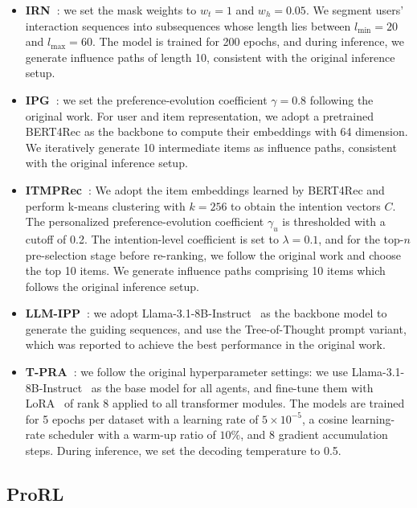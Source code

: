 \begin{itemize}
    \item \textbf{IRN~\cite{zhu2023influential}}: we set the mask weights to \(w_t = 1\) and \(w_h = 0.05\). We segment users' interaction sequences into subsequences whose length lies between \(l_{\min} = 20\) and \(l_{\max} = 60\). The model is trained for 200 epochs, and during inference, we generate influence paths of length 10, consistent with the original inference setup.
    \item \textbf{IPG~\cite{bi2024proactive}}: we set the preference-evolution coefficient $\gamma=0.8$ following the original work. For user and item representation, we adopt a pretrained BERT4Rec as the backbone to compute their embeddings with 64 dimension. We iteratively generate 10 intermediate items as influence paths, consistent with the original inference setup.
    \item \textbf{ITMPRec~\cite{lian2025itmprec}}: We adopt the item embeddings learned by BERT4Rec and perform k-means clustering with \(k = 256\) to obtain the intention vectors $C$. The personalized preference-evolution coefficient \(\gamma_u\) is thresholded with a cutoff of 0.2. The intention-level coefficient is set to \(\lambda = 0.1\), and for the top-\(n\) pre-selection stage before re-ranking, we follow the original work and choose the top 10 items. We generate influence paths comprising 10 items which follows the original inference setup.
    \item \textbf{LLM-IPP~\cite{wang2025leveraging}}: we adopt Llama-3.1-8B-Instruct~\cite{dubey2024llama} as the backbone model to generate the guiding sequences, and use the Tree-of-Thought prompt variant, which was reported to achieve the best performance in the original work.
    \item \textbf{T-PRA~\cite{wang2025tunable}}: we follow the original hyperparameter settings: we use Llama-3.1-8B-Instruct~\cite{dubey2024llama} as the base model for all agents, and fine-tune them with LoRA~\cite{hu2022lora} of rank 8 applied to all transformer modules. The models are trained for 5 epochs per dataset with a learning rate of \(5\times10^{-5}\), a cosine learning-rate scheduler with a warm-up ratio of \(10\%\), and 8 gradient accumulation steps. During inference, we set the decoding temperature to 0.5.
\end{itemize}

\subsection{ProRL}
\label{app:prorl}

